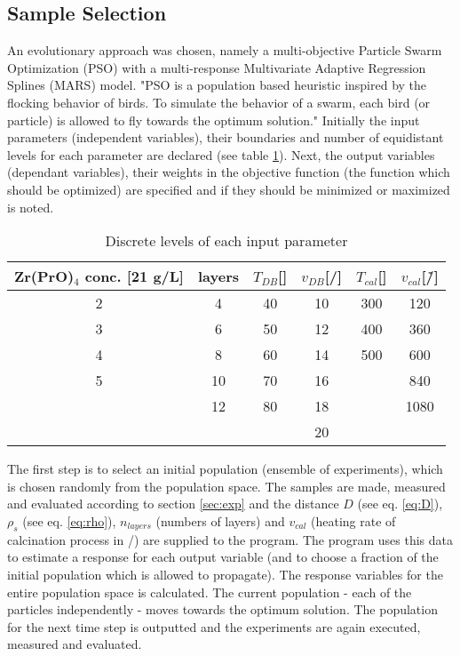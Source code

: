 \subsection{Sample Selection}
\label{sec:ss}
An evolutionary approach was chosen, namely a multi-objective Particle Swarm Optimization (PSO) with a multi-response
Multivariate Adaptive Regression Splines (MARS) model\cite{Villanova2010,Kennedy1995,Breiman1997,Carta2011}.
%
"PSO is a population based heuristic inspired by the flocking behavior of birds. 
To simulate the behavior of a swarm, each bird (or particle) is allowed to fly towards the optimum solution."\cite{Villanova2010}
%
Initially the input parameters (independent variables), their boundaries and number of equidistant levels for each parameter are declared (see table \ref{tab:input}).
Next, the output variables (dependant variables), their weights in the objective function (the function which should be optimized) are specified and if they should be minimized or maximized is noted.
%
\begin{table}[htb]
	\centering
	\begin{tabular}{cc cc cc}
		\hline
		Zr(PrO)$_4$ conc. [21 g/L]	&layers	&$T_{DB}$[\oc{}]	&$v_{DB}$[\mm{}/\s{}]	&$T_{cal}$[\oc{}]	&$v_{cal}$[\oc{}/\h{}]	\\
		\hline
		2				&4		&40					&10				&300				&120	\\
		3				&6		&50					&12				&400				&360	\\
		4				&8		&60					&14				&500				&600	\\
		5				&10		&70					&16				&					&840	\\
						&12		&80					&18				&					&1080	\\
						&		&					&20				&					&		\\
		\hline
	\end{tabular}
	\caption{Discrete levels of each input parameter \td{are concentrations correct?}}
	\label{tab:input}
\end{table}

The first step is to select an initial population (ensemble of experiments), which is chosen randomly from the population space. 
The samples are made, measured and evaluated according to section \ref{sec:exp} and the distance $D$ (see eq. \ref{eq:D}), $\rho_s$ (see eq. \ref{eq:rho}), $n_{layers}$ (numbers of layers) and $v_{cal}$ (heating rate of calcination process in \oc{}/\minutes{}) are supplied to the program. 
The program uses this data to estimate a response for each output variable (and to choose a fraction of the initial population which is allowed to propagate).
The response variables for the entire population space is calculated. 
The current population - each of the particles independently - moves towards the optimum solution.
The population for the next time step is outputted and the experiments are again executed, measured and evaluated.

